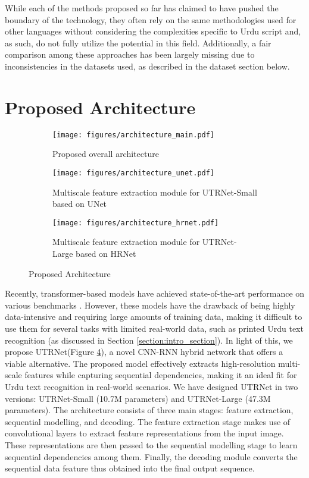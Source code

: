 \documentclass[runningheads]{llncs}
\newcommand{\ModelName}{{UTRNet}\xspace}
\begin{document}
While each of the methods proposed so far has claimed to have pushed the boundary of the technology, they often rely on the same methodologies used for other languages without considering the complexities specific to Urdu script and, as such, do not fully utilize the potential in this field. Additionally, a fair comparison among these approaches has been largely missing due to inconsistencies in the datasets used, as described in the dataset section below. 
\section{Proposed Architecture}
\label{section:architecture_section}

\begin{figure}[t]
	\begin{subfigure}[b]{1.0\linewidth}
		\centering
		\texttt{[image: figures/architecture\_main.pdf]}
		\caption{Proposed overall architecture}
		\label{fig:arch_overall}
	\end{subfigure}
	\begin{subfigure}[b]{1.0\linewidth}
		\centering
		\texttt{[image: figures/architecture\_unet.pdf]}
		\caption{Multiscale feature extraction module for \ModelName-Small based on UNet \cite{unet_orig_paper}}
		\label{fig:arch_small}
	\end{subfigure}
	\begin{subfigure}[b]{1.0\linewidth}
		\centering
		\texttt{[image: figures/architecture\_hrnet.pdf]}
		\caption{Multiscale feature extraction module for \ModelName-Large based on HRNet \cite{hrnet_orig}}
		\label{fig:arch_large}
	\end{subfigure}
	\caption{Proposed Architecture}
	\label{fig:arch}
\end{figure}

Recently, transformer-based models have achieved state-of-the-art performance on various benchmarks \cite{vit_applications_survey}. However, these models have the drawback of being highly data-intensive and requiring large amounts of training data, making it difficult to use them for several tasks with limited real-world data, such as printed Urdu text recognition (as discussed in Section \ref{section:intro_section}). In light of this, we propose \ModelName (Figure \ref{fig:arch}), a novel CNN-RNN hybrid network that offers a viable alternative. The proposed model effectively extracts high-resolution multi-scale features while capturing sequential dependencies, making it an ideal fit for Urdu text recognition in real-world scenarios. We have designed \ModelName in two versions: \ModelName-Small (10.7M parameters) and \ModelName-Large (47.3M parameters). The architecture consists of three main stages: feature extraction, sequential modelling, and decoding. The feature extraction stage makes use of convolutional layers to extract feature representations from the input image. These representations are then passed to the sequential modelling stage to learn sequential dependencies among them. Finally, the decoding module converts the sequential data feature thus obtained into the final output sequence.
\end{document}
